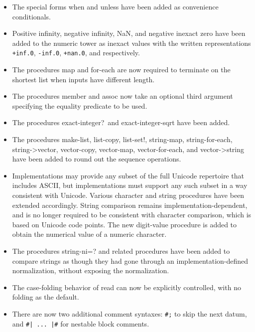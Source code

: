 \begin{itemize}
\item The special forms {\cf when} and {\cf unless} have been added as convenience
conditionals.

\item Positive infinity, negative infinity, NaN, and negative inexact zero have been added
to the numeric tower as inexact values with the written
representations {\tt +inf.0}, {\tt -inf.0}, {\tt +nan.0}, and {}
respectively.

\item The procedures {\cf map} and {\cf for-each} are now required to terminate on
the shortest list when inputs have different length.

\item The procedures {\cf member} and {\cf assoc} now take an optional third argument
specifying the equality predicate to be used.

\item The procedures {\cf exact-integer?}\  and {\cf exact-integer-sqrt} have been added.

\item The procedures {\cf make-list}, {\cf list-copy}, {\cf list-set!}, {\cf
string-map}, {\cf string-for-each}, {\cf string->vector}, {\cf
vector-copy}, {\cf vector-map}, {\cf vector-for-each}, and {\cf
vector->string} have been added to round out the sequence operations.

\item Implementations may provide any subset of the full Unicode
repertoire that includes ASCII, but implementations must support any
such subset in a way consistent with Unicode.
Various character and string procedures have been extended accordingly.
String comparison remains implementation-dependent, and is no longer
required to be consistent with character comparison, which is based
on Unicode code points.
The new {\cf digit-value} procedure is added to obtain the numerical
value of a numeric character.

\item The procedures {\cf string-ni=?} and related procedures have been added to
compare strings as though they had gone through an
implementation-defined normalization, without exposing the
normalization.

\item The case-folding behavior of {\cf read} can now be explicitly
controlled, with no folding as the default.

\item There are now two additional comment syntaxes: {\tt \#;} to
skip the next datum, and {\tt \#| ... |\#}
for nestable block comments.


\end{itemize}
